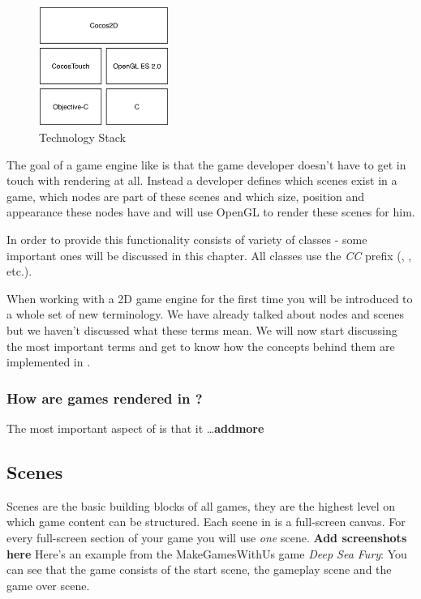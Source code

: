 \begin{figure}[H]
		\centering
		\includegraphics[width=120pt]{images/cocos2d/TechnologyStack.png}     
		\caption{\cocos{} Technology Stack}
\end{figure}

The goal of a game engine like \cocos{} is that the game developer doesn't have
to get in touch with rendering at all. Instead a developer defines which scenes
exist in a game, which nodes are part of these scenes and which size, position
and appearance these nodes have and \cocos{} will use OpenGL to render these
scenes for him.

In order to provide this functionality \cocos{} consists of variety of classes -
some important ones will be discussed in this chapter. All \cocos{} classes use the \textit{CC} prefix (\ccscene{}, \ccnode{}, etc.).

When working with a 2D game engine for the first time you will be introduced to
a whole set of new terminology. We have already talked about nodes and scenes
but we haven't discussed what these terms mean. We will now start discussing the
most important terms and get to know how the concepts behind them are
implemented in \cocos{}.

\subsubsection{How are games rendered in \cocos{}?}
The most important aspect of \cocos{} is that it
\ldots \textbf{addmore}

\subsection{Scenes}
Scenes are the basic building blocks of all \cocos{} games, they are the
highest level on which game content can be structured. Each scene in \cocos{} is
a full-screen canvas. For every full-screen section of your game you will use
\textit{one} scene.
\textbf{Add screenshots here}
Here's an example from the MakeGamesWithUs game \textit{Deep Sea Fury}:
You can see that the game consists of the start scene, the gameplay scene and
the game over scene.


